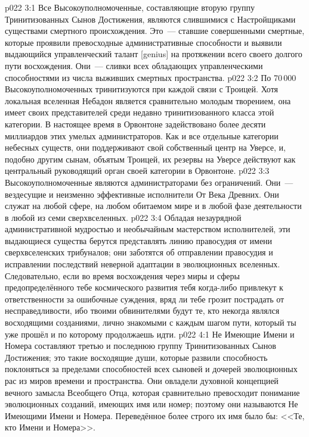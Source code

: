 \vs p022 3:1 Все Высокоуполномоченные, составляющие вторую группу Тринитизованных Сынов Достижения, являются слившимися с Настройщиками существами смертного происхождения. Это~--- ставшие совершенными смертные, которые проявили превосходные административные способности и выявили выдающийся управленческий талант [genius] на протяжении всего своего долгого пути восхождения. Они~--- сливки всех обладающих управленческими способностями из числа выживших смертных пространства.
\vs p022 3:2 По 70\,000 Высокоуполномоченных тринитизуются при каждой связи с Троицей. Хотя локальная вселенная Небадон является сравнительно молодым творением, она имеет своих представителей среди недавно тринитизованного класса этой категории. В настоящее время в Орвонтоне задействовано более десяти миллиардов этих умелых администраторов. Как и все отдельные категории небесных существ, они поддерживают свой собственный центр на Уверсе, и, подобно другим сынам, объятым Троицей, их резервы на Уверсе действуют как центральный руководящий орган своей категории в Орвонтоне.
\vs p022 3:3 Высокоуполномоченные являются администраторами без ограничений. Они~--- вездесущие и неизменно эффективные исполнители От Века Древних. Они служат на любой сфере, на любом обитаемом мире и в любой фазе деятельности в любой из семи сверхвселенных.
\vs p022 3:4 Обладая незаурядной административной мудростью и необычайным мастерством исполнителей, эти выдающиеся существа берутся представлять линию правосудия от имени сверхвселенских трибуналов; они заботятся об отправлении правосудия и исправлении последствий неверной адаптации в эволюционных вселенных. Следовательно, если во время восхождения через миры и сферы предопределённого тебе космического развития тебя когда\hyp{}либо привлекут к ответственности за ошибочные суждения, вряд ли тебе грозит пострадать от несправедливости, ибо твоими обвинителями будут те, кто некогда являлся восходящими созданиями, лично знакомыми с каждым шагом пути, который ты уже прошёл и по которому продолжаешь идти.
\vs p022 4:1 Не Имеющие Имени и Номера составляют третью и последнюю группу Тринитизованных Сынов Достижения; это такие восходящие души, которые развили способность поклоняться за пределами способностей всех сыновей и дочерей эволюционных рас из миров времени и пространства. Они овладели духовной концепцией вечного замысла Всеобщего Отца, которая сравнительно превосходит понимание эволюционных созданий, имеющих имя или номер; поэтому они называются Не Имеющими Имени и Номера. Переведённое более строго их имя было бы: <<Те, кто  Имени и Номера>>.
